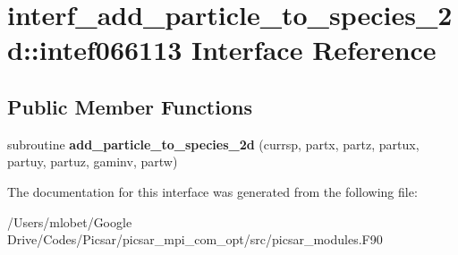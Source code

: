 \hypertarget{interfaceinterf__add__particle__to__species__2d_1_1intef066113}{}\section{interf\+\_\+add\+\_\+particle\+\_\+to\+\_\+species\+\_\+2d\+:\+:intef066113 Interface Reference}
\label{interfaceinterf__add__particle__to__species__2d_1_1intef066113}
\subsection*{Public Member Functions}
\begin{DoxyCompactItemize}
\item 
subroutine {\bfseries add\+\_\+particle\+\_\+to\+\_\+species\+\_\+2d} (currsp, partx, partz, partux, partuy, partuz, gaminv, partw)\hypertarget{interfaceinterf__add__particle__to__species__2d_1_1intef066113_a71c2a8e9d63f044cc29381bb76410276}{}\label{interfaceinterf__add__particle__to__species__2d_1_1intef066113_a71c2a8e9d63f044cc29381bb76410276}

\end{DoxyCompactItemize}


The documentation for this interface was generated from the following file\+:\begin{DoxyCompactItemize}
\item 
/\+Users/mlobet/\+Google Drive/\+Codes/\+Picsar/picsar\+\_\+mpi\+\_\+com\+\_\+opt/src/picsar\+\_\+modules.\+F90\end{DoxyCompactItemize}
